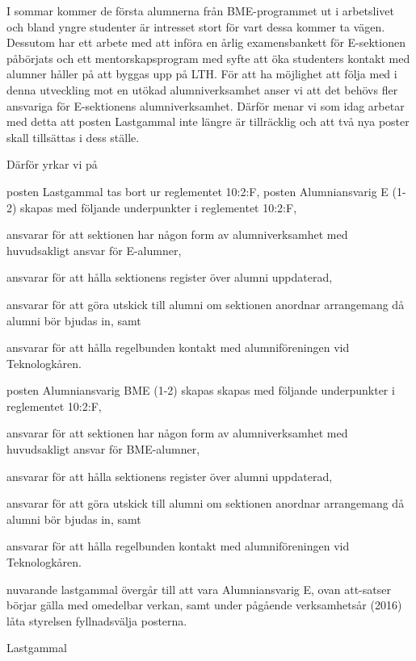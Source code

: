 \documentclass[../_main/handlingar.tex]{subfiles}
\begin{document}

I sommar kommer de första alumnerna från BME-programmet ut i arbetslivet och bland yngre studenter är intresset stort för vart dessa kommer ta vägen. Dessutom har ett arbete med att införa en årlig examensbankett för E-sektionen påbörjats och ett mentorskapsprogram med syfte att öka studenters kontakt med alumner håller på att byggas upp på LTH. För att ha möjlighet att följa med i denna utveckling mot en utökad alumniverksamhet anser vi att det behövs fler ansvariga för E-sektionens alumniverksamhet. Därför menar vi som idag arbetar med detta att posten Lastgammal inte längre är tillräcklig och att två nya poster skall tillsättas i dess ställe.


Därför yrkar vi på
\begin{attsatser}
    \att posten Lastgammal tas bort ur reglementet 10:2:F,
    \att posten Alumniansvarig E (1-2) skapas med följande underpunkter i reglementet 10:2:F,
    \begin{itshape}
    \begin{itemizedash}
            \item ansvarar för att sektionen har någon form av alumniverksamhet med huvudsakligt ansvar för E-alumner,
            \item ansvarar för att hålla sektionens register över alumni uppdaterad,
            \item ansvarar för att göra utskick till alumni om sektionen anordnar arrangemang då alumni
bör bjudas in, samt
            \item  ansvarar för att hålla regelbunden kontakt med alumniföreningen vid Teknologkåren.
     \end{itemizedash}
     \end{itshape}
    \att posten Alumniansvarig BME (1-2) skapas  skapas med följande underpunkter i reglementet 10:2:F,
        \begin{itshape}
    \begin{itemizedash}
            \item ansvarar för att sektionen har någon form av alumniverksamhet med huvudsakligt ansvar för BME-alumner,
            \item ansvarar för att hålla sektionens register över alumni uppdaterad,
            \item ansvarar för att göra utskick till alumni om sektionen anordnar arrangemang då alumni
bör bjudas in, samt
            \item  ansvarar för att hålla regelbunden kontakt med alumniföreningen vid Teknologkåren.
     \end{itemizedash}
     \end{itshape}
    \att nuvarande lastgammal övergår till att vara Alumniansvarig E,
    \att ovan att-satser börjar gälla med omedelbar verkan, samt
    \att under pågående verksamhetsår (2016) låta styrelsen fyllnadsvälja posterna.
\end{attsatser}

\begin{signatures}{3}
    \mvh
    \signature{My Reimer}{Lastgammal}
    \signature{Elin Magnusson}{}
    \signature{Ebba Palenius}{}
\end{signatures}
\end{document}
